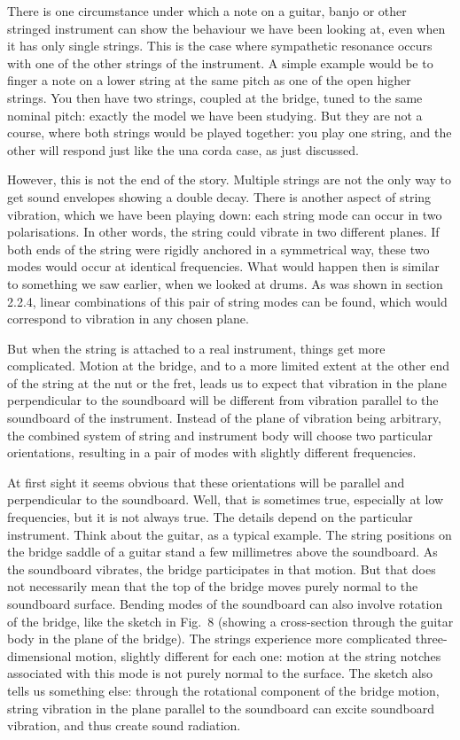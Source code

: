   There is one circumstance under which a note on a guitar, banjo or other 
  stringed instrument can show the behaviour we have been looking at, even when 
  it has only single strings. This is the case where sympathetic resonance 
  occurs with one of the other strings of the instrument. A simple example 
  would be to finger a note on a lower string at the same pitch as one of the 
  open higher strings. You then have two strings, coupled at the bridge, tuned 
  to the same nominal pitch: exactly the model we have been studying. But they 
  are not a course, where both strings would be played together: you play one 
  string, and the other will respond just like the una corda case, as just 
  discussed. 

  However, this is not the end of the story. Multiple strings are not the only 
  way to get sound envelopes showing a double decay. There is another aspect of 
  string vibration, which we have been playing down: each string mode can occur 
  in two polarisations. In other words, the string could vibrate in two 
  different planes. If both ends of the string were rigidly anchored in a 
  symmetrical way, these two modes would occur at identical frequencies. What 
  would happen then is similar to something we saw earlier, when we looked at 
  drums. As was shown in section 2.2.4, linear combinations of this pair of 
  string modes can be found, which would correspond to vibration in any chosen 
  plane. 

  But when the string is attached to a real instrument, things get more 
  complicated. Motion at the bridge, and to a more limited extent at the other 
  end of the string at the nut or the fret, leads us to expect that vibration 
  in the plane perpendicular to the soundboard will be different from vibration 
  parallel to the soundboard of the instrument. Instead of the plane of 
  vibration being arbitrary, the combined system of string and instrument body 
  will choose two particular orientations, resulting in a pair of modes with 
  slightly different frequencies. 

  At first sight it seems obvious that these orientations will be parallel and 
  perpendicular to the soundboard. Well, that is sometimes true, especially at 
  low frequencies, but it is not always true. The details depend on the 
  particular instrument. Think about the guitar, as a typical example. The 
  string positions on the bridge saddle of a guitar stand a few millimetres 
  above the soundboard. As the soundboard vibrates, the bridge participates in 
  that motion. But that does not necessarily mean that the top of the bridge 
  moves purely normal to the soundboard surface. Bending modes of the 
  soundboard can also involve rotation of the bridge, like the sketch in Fig.\ 
  8 (showing a cross-section through the guitar body in the plane of the 
  bridge). The strings experience more complicated three-dimensional motion, 
  slightly different for each one: motion at the string notches associated with 
  this mode is not purely normal to the surface. The sketch also tells us 
  something else: through the rotational component of the bridge motion, string 
  vibration in the plane parallel to the soundboard can excite soundboard 
  vibration, and thus create sound radiation. 

